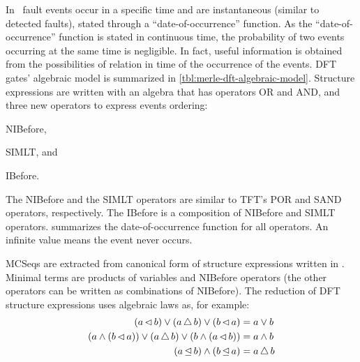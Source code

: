\documentclass[12pt,openright,twoside,a4paper,oldfontcommands,english,brazil,final]{abntex2}
\theoremstyle{theo}
\newcommand{\parsin}[1]{\ensuremath\left( #1 \right)}
\def\nibefore{\ensuremath\operatorname{\lhd}}
\def\ibefore{\ensuremath\operatorname{\unlhd}}
\def\simultaneous{\ensuremath\operatorname{\bigtriangleup}}
\begin{document}
In~\cite{Merle2010,MRL+2010,MRL2011} fault events occur in a specific time and are instantaneous (similar to detected faults), stated through a ``date-of-occurrence'' function.
As the ``date-of-occurrence'' function is stated in continuous time, the probability of two events occurring at the same time is negligible.
In fact, useful information is obtained from the possibilities of relation in time of the occurrence of the events.
\Ac{DFT} gates' algebraic model is summarized in \cref{tbl:merle-dft-algebraic-model}.
Structure expressions are written with an algebra that has operators \ac{OR} and \ac{AND}, and three new operators to express events ordering:
\begin{alineasinline}
  \item \ac{NIBefore},
  \item \ac{SIMLT}, and
  \item \ac{IBefore}.
\end{alineasinline}
The \ac{NIBefore} and the \ac{SIMLT} operators are similar to \ac{TFT}'s \ac{POR} and \ac{SAND} operators, respectively.
The \ac{IBefore} is a composition of \ac{NIBefore} and \ac{SIMLT} operators.
 summarizes the date-of-occurrence function for all operators.
An infinite value means the event never occurs.

\Acp{MCSeq} are extracted from canonical form of structure expressions written in .
Minimal terms are products of variables and \ac{NIBefore} operators (the other operators can be written as combinations of \ac{NIBefore}).
The reduction of \ac{DFT} structure expressions uses algebraic laws as, for example:
\begin{subequations}
\begin{align}
\parsin{a \nibefore b} \lor
  \parsin{a \simultaneous b} \lor
  \parsin{b \nibefore a} &= a \lor b\\
%
\parsin{a \land \parsin{b \nibefore a}} \lor
  \parsin{a \simultaneous b} \lor
  \parsin{b \land \parsin{a \nibefore b}} &= a \land b\\
%
\parsin{a \ibefore b} \land \parsin{b \ibefore a} &= a \simultaneous b
\end{align}
\end{subequations}
\end{document}
